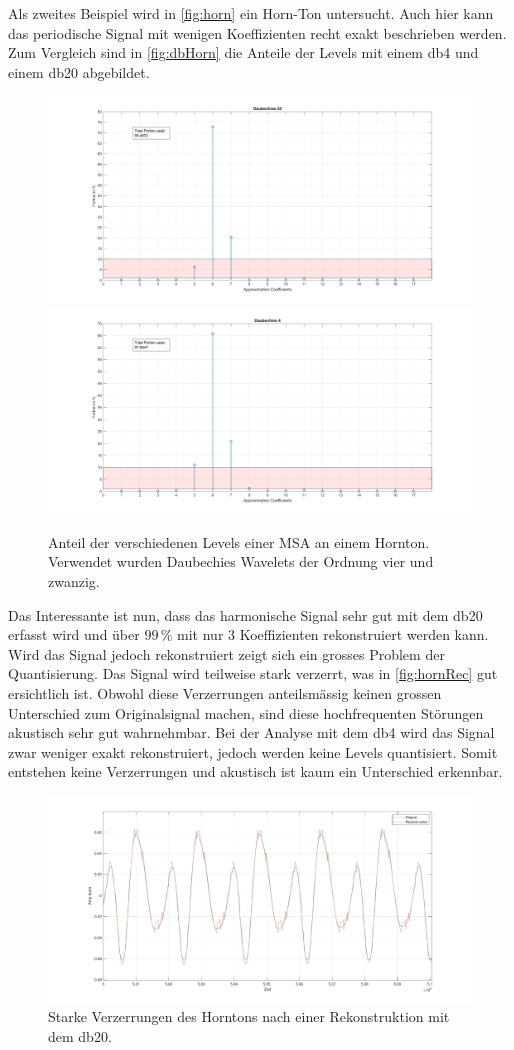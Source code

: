 \begin{refsection}
Als zweites Beispiel wird in \autoref{fig:horn} ein Horn-Ton untersucht.
Auch hier kann das periodische Signal mit wenigen Koeffizienten recht exakt beschrieben werden. 
Zum Vergleich sind in \autoref{fig:dbHorn} die Anteile der Levels mit einem db4 und einem db20 abgebildet.
\begin{figure}
	\includegraphics[width=0.5\linewidth]{papers/compress/Bilder/frenchHorn_db20.pdf}
	\includegraphics[width=0.5\linewidth]{papers/compress/Bilder/frenchHorn_db4.pdf}
	\caption{Anteil der verschiedenen Levels einer MSA an einem Hornton. Verwendet wurden Daubechies Wavelets der Ordnung vier und zwanzig.}
	\label{fig:dbHorn}
\end{figure}
Das Interessante ist nun, dass das harmonische Signal sehr gut mit dem db20 erfasst wird und über $99\,\text{\%}$ mit nur 3 Koeffizienten rekonstruiert werden kann.
Wird das Signal jedoch rekonstruiert zeigt sich ein grosses Problem der Quantisierung.
Das Signal wird teilweise stark verzerrt, was in \autoref{fig:hornRec} gut ersichtlich ist.
Obwohl diese Verzerrungen anteilsmässig keinen grossen Unterschied zum Originalsignal machen, sind diese hochfrequenten Störungen akustisch sehr gut wahrnehmbar.
Bei der Analyse mit dem db4 wird das Signal zwar weniger exakt rekonstruiert, jedoch werden keine Levels quantisiert.
Somit entstehen keine Verzerrungen und akustisch ist kaum ein Unterschied erkennbar.
\begin{figure}
	\centering
	\includegraphics[width=\linewidth]{papers/compress/Bilder/frenchHorn_rec.pdf}
	\caption{Starke Verzerrungen des Horntons nach einer Rekonstruktion mit dem db20.}
	\label{fig:hornRec}
\end{figure}


\end{refsection}

